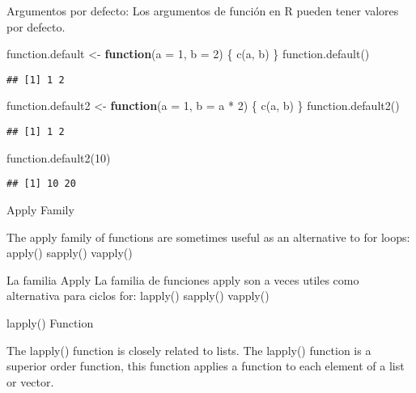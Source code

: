 \documentclass[
]{article}
\newenvironment{Shaded}{\begin{snugshade}}{\end{snugshade}}
\newcommand{\AttributeTok}[1]{\textcolor[rgb]{0.77,0.63,0.00}{#1}}
\newcommand{\ControlFlowTok}[1]{\textcolor[rgb]{0.13,0.29,0.53}{\textbf{#1}}}
\newcommand{\DecValTok}[1]{\textcolor[rgb]{0.00,0.00,0.81}{#1}}
\newcommand{\FunctionTok}[1]{\textcolor[rgb]{0.00,0.00,0.00}{#1}}
\newcommand{\NormalTok}[1]{#1}
\newcommand{\OtherTok}[1]{\textcolor[rgb]{0.56,0.35,0.01}{#1}}
\newcommand{\SpecialCharTok}[1]{\textcolor[rgb]{0.00,0.00,0.00}{#1}}
\begin{document}
Argumentos por defecto: Los argumentos de función en R pueden tener
valores por defecto.

\begin{Shaded}
\begin{Highlighting}[]
\NormalTok{function.default }\OtherTok{\textless{}{-}} \ControlFlowTok{function}\NormalTok{(}\AttributeTok{a =} \DecValTok{1}\NormalTok{, }\AttributeTok{b =} \DecValTok{2}\NormalTok{) \{}
  \FunctionTok{c}\NormalTok{(a, b)}
\NormalTok{\}}
\FunctionTok{function.default}\NormalTok{()}
\end{Highlighting}
\end{Shaded}

\begin{verbatim}
## [1] 1 2
\end{verbatim}

\begin{Shaded}
\begin{Highlighting}[]
\NormalTok{function.default2 }\OtherTok{\textless{}{-}} \ControlFlowTok{function}\NormalTok{(}\AttributeTok{a =} \DecValTok{1}\NormalTok{, }\AttributeTok{b =}\NormalTok{ a }\SpecialCharTok{*} \DecValTok{2}\NormalTok{) \{}
  \FunctionTok{c}\NormalTok{(a, b)}
\NormalTok{\}}
\FunctionTok{function.default2}\NormalTok{()}
\end{Highlighting}
\end{Shaded}

\begin{verbatim}
## [1] 1 2
\end{verbatim}

\begin{Shaded}
\begin{Highlighting}[]
\FunctionTok{function.default2}\NormalTok{(}\DecValTok{10}\NormalTok{)}
\end{Highlighting}
\end{Shaded}

\begin{verbatim}
## [1] 10 20
\end{verbatim}

Apply Family

The apply family of functions are sometimes useful as an alternative to
for loops: apply() sapply() vapply()

La familia Apply La familia de funciones apply son a veces utiles como
alternativa para ciclos for: lapply() sapply() vapply()

lapply() Function

The lapply() function is closely related to lists. The lapply() function
is a superior order function, this function applies a function to each
element of a list or vector.
\end{document}
